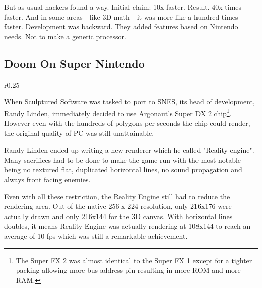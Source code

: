 But as usual hackers found a way. Initial claim: 10x faster. Result. 40x times faster. And in some areas - like 3D math - it was more like a hundred times faster. Development was backward. They added features based on Nintendo needs. Not to make a generic processor.\\
\par

\pagebreak


\par
{}


\subsection{Doom On Super Nintendo}

\par
\begin{wrapfigure}[11]{r}{0.25\textwidth}
\centering
{}
\end{wrapfigure}
When Sculptured Software was tasked to port \doom to SNES, its head of development, Randy Linden, immediately decided to use Argonaut's Super DX 2 chip\footnote{The Super FX 2 was almost identical to the Super FX 1 except for a tighter packing allowing more bus address pin resulting in more ROM and more RAM.}. However even with the hundreds of polygons per seconds the chip could render, the original quality of PC \doom was still unattainable.\\
\par
 Randy Linden ended up writing a new renderer which he called "Reality engine". Many sacrifices had to be done to make the game run with the most notable being no textured flat, duplicated horizontal lines, no sound propagation and always front facing enemies.\\
\par Even with all these restriction, the Reality Engine still had to reduce the rendering area. Out of the native 256 x 224 resolution, only 216x176 were actually drawn and only 216x144 for the 3D canvas. With horizontal lines doubles, it means Reality Engine was actually rendering at 108x144 to reach an average of 10 fps which was still a remarkable achievement.\\





